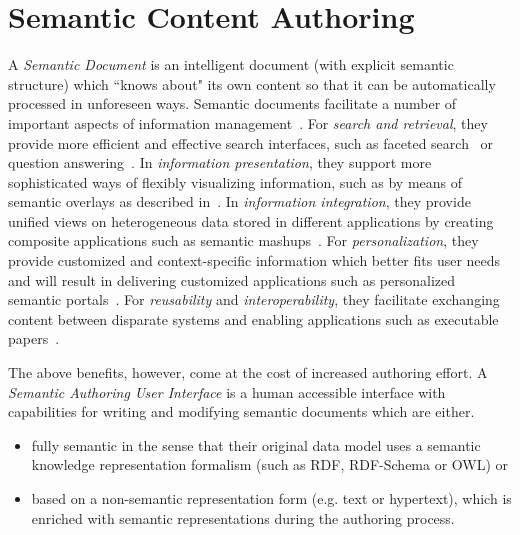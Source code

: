 \documentclass[10pt, conference, compsocconf]{IEEEtran}
\begin{document}
\section{Semantic Content Authoring}
\label{sec:sca}
 A \emph{Semantic Document} is an intelligent document (with explicit semantic structure) which ``knows about" its own content so that it can be automatically processed in unforeseen ways.
Semantic documents facilitate a number of important aspects of information management~\cite{rdface}.
For \emph{search and retrieval}, they provide more efficient and effective search interfaces, such as faceted search~\cite{tunkenlang2009faceted} or question answering~\cite{Lopez2011}.
In \emph{information presentation}, they support more sophisticated ways of flexibly visualizing information, such as by means of semantic overlays as described in~\cite{Burel2009}.
In \emph{information integration}, they provide unified views on heterogeneous data stored in different applications by creating composite applications such as semantic mashups~\cite{Ankolekar2007}.
For \emph{personalization}, they provide customized and context-specific information which better fits user needs and will
result in delivering customized applications such as personalized semantic portals~\cite{ecs2007}.
For \emph{reusability} and \emph{interoperability}, they facilitate exchanging content between disparate systems and enabling applications such as executable papers~\cite{Muller2011}.


The above benefits, however, come at the cost of increased authoring effort. %
A \emph{Semantic Authoring User Interface} is a human accessible interface with capabilities for writing and modifying semantic documents which are either.
\begin{itemize}
	\item fully semantic in the sense that their original data model uses a semantic knowledge representation formalism (such as RDF, RDF-Schema or OWL) or
	\item based on a non-semantic representation form (e.g. text or hypertext), which is enriched with semantic representations during the authoring process.\\
\end{itemize}

\end{document}
